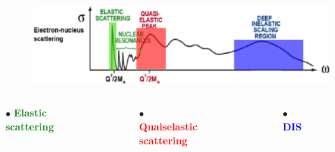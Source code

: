 \documentclass[12pt]{beamer}
\begin{document}
\begin{frame}

\begin{figure}[]
	\centering
	\includegraphics[width=12cm]{../images/Thesis/E_nucleus_spect_DIS.png}
\end{figure}
\begin{columns}[t]
$\bullet$ \textbf{\textcolor{green}{Elastic scattering}}
\begin{figure}[]
	\includegraphics[width=3.5cm]{../images/elast_draw.png}
\end{figure}
$\bullet$ \textbf{\textcolor{red}{Quaiselastic scattering}}
	\vspace{-10pt}
\begin{figure}[]
	\includegraphics[width=3.5cm]{../images/quais_draw.png}
\end{figure}
$\bullet$ \textbf{\textcolor{blue}{DIS}}
\vspace{8pt}
\begin{figure}[]
	\includegraphics[width=3.5cm]{../images/dis_draw.png}
\end{figure}
	
\end{columns}
\end{frame}
\end{document}
